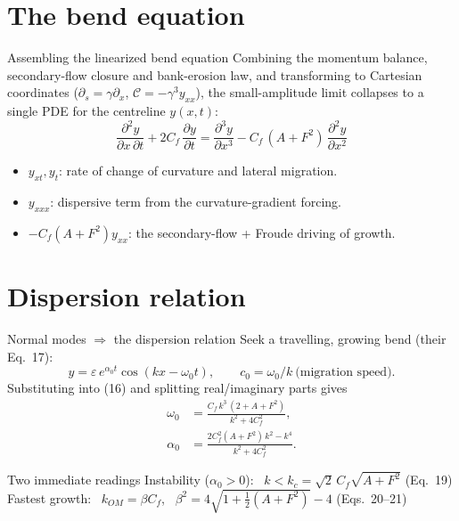 \documentclass[aspectratio=169,10pt]{beamer}
\begin{document}
\section{The bend equation}

\begin{frame}{Assembling the linearized bend equation}
  Combining the momentum balance, secondary-flow closure and bank-erosion law, and
  transforming to Cartesian coordinates ($\partial_s=\gamma\partial_x$,
  $\mathcal C=-\gamma^3 y_{xx}$), the small-amplitude limit collapses to a single PDE
  for the centreline $y(x,t)$:
  \[
    \boxed{\;\frac{\partial^2 y}{\partial x\,\partial t}
      + 2C_f\,\frac{\partial y}{\partial t}
      = \frac{\partial^3 y}{\partial x^3}
      - C_f\,(A+F^2)\,\frac{\partial^2 y}{\partial x^2}\;} \tag{16}
  \]
  \begin{itemize}
    \item $y_{xt}, y_t$: rate of change of curvature and lateral migration.
    \item $y_{xxx}$: dispersive term from the curvature-gradient forcing.
    \item $-C_f(A+F^2)y_{xx}$: the secondary-flow + Froude driving of growth.
  \end{itemize}
\end{frame}

\section{Dispersion relation}

\begin{frame}{Normal modes $\Rightarrow$ the dispersion relation}
  Seek a travelling, growing bend (their Eq.~17):
  \[
    y = \varepsilon\,e^{\alpha_0 t}\cos(kx-\omega_0 t),\qquad
    c_0=\omega_0/k\ \text{(migration speed)}.
  \]
  Substituting into (16) and splitting real/imaginary parts gives
  \begin{align}
    \omega_0 &= \frac{C_f\,k^3\,(2+A+F^2)}{k^2+4C_f^2}, \tag{18a}\\[0.3em]
    \alpha_0 &= \frac{2C_f^2(A+F^2)\,k^2 - k^4}{k^2+4C_f^2}. \tag{18b}
  \end{align}
  \begin{block}{Two immediate readings}
    \small
    Instability ($\alpha_0>0$): \ $k<k_c=\sqrt{2}\,C_f\sqrt{A+F^2}$ \hfill (Eq.~19)\\
    Fastest growth: \ $k_{OM}=\beta C_f$, \ $\beta^2 = 4\sqrt{1+\tfrac12(A+F^2)}-4$ \hfill (Eqs.~20--21)
  \end{block}
\end{frame}
\end{document}
